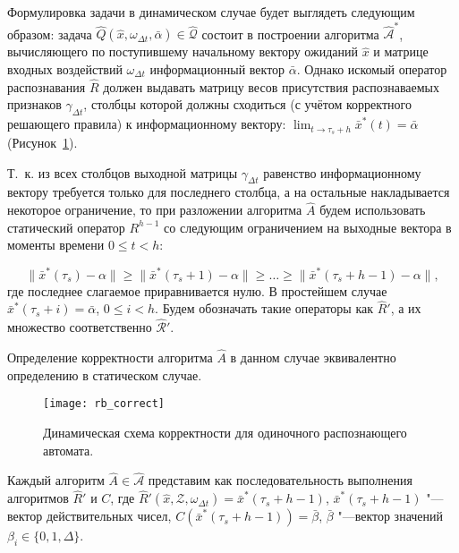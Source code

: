 Формулировка задачи в динамическом случае будет выглядеть следующим образом: задача $\hat{Q}(\hat{x}, \omega_{{\Delta}t}, \bar{\alpha})\in\hat{\mathcal Q}$ состоит в построении алгоритма $\hat{\mathcal A}^*$, вычисляющего по поступившему начальному вектору ожиданий $\hat{x}$ и матрице входных воздействий $\omega_{{\Delta}t}$ информационный вектор $\bar{\alpha}$. Однако искомый оператор распознавания $\hat{R}$ должен выдавать матрицу весов присутствия распознаваемых признаков $\gamma_{\Delta{t}}$, столбцы которой должны сходиться (с учётом корректного решающего правила) к информационному вектору: $\lim_{t\to\tau_s+h}\bar{x}^*(t)=\bar{\alpha}$ (Рисунок~\ref{fig:rb_correct_dyn}). 

Т.~к. из всех столбцов выходной матрицы $\gamma_{\Delta t}$ равенство информационному вектору требуется только для последнего столбца, а на остальные накладывается некоторое ограничение, то при разложении алгоритма $\hat A$ будем использовать статический оператор $R^{h-1}$ со следующим ограничением на выходные вектора в моменты времени $0\leqslant t<h$:

\begin{equation}\label{cond:dyn_to_stat}
	\|\bar x^*(\tau_s)-\alpha\|\geqslant \|\bar x^*(\tau_s+1)-\alpha\|\geqslant \dots\geqslant\|\bar x^*(\tau_s+h-1)-\alpha\|,
\end{equation}
где последнее слагаемое приравнивается нулю.  В простейшем случае  $\bar x^*(\tau_s+i)=\bar{\alpha}$, $0\leqslant i < h$. Будем обозначать такие операторы как $\hat R'$, а их множество соответственно $\hat{\mathcal R}'$. 

Определение корректности алгоритма $\hat A$ в данном случае эквивалентно определению в статическом случае.
\begin{figure}[h]
	\centering
	\texttt{[image: rb\_correct]}
	\caption{Динамическая схема корректности для одиночного распознающего автомата.}
	\label{fig:rb_correct_dyn}
\end{figure}

\begin{Pred}
	\label{st:decompositon_dyn}
	Каждый алгоритм $\hat A\in\hat{\mathcal A}$ представим как последовательность выполнения алгоритмов $\hat R'$ и $C$, где $\hat R'(\hat x, \mathcal{Z}, \omega_{\Delta{t}})=\bar x^*(\tau_s+h-1)$, $\bar x^*(\tau_s+h-1)$ "--- вектор действительных чисел, $C(\bar x^*(\tau_s+h-1))=\bar\beta$, $\bar\beta$ "---вектор значений $\beta_i\in\{0,1,\Delta\}$.
\end{Pred}

